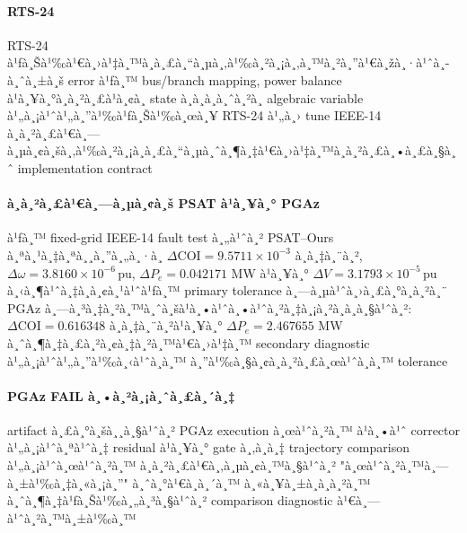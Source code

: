 ﻿\documentclass[12pt,a4paper]{article}
\newcommand{\pu}{\ensuremath{\,\mathrm{pu}}}
\newcommand{\sci}[2]{\ensuremath{#1\times10^{#2}}}
\begin{document}
\paragraph{RTS-24}
RTS-24 à¹ƒà¸Šà¹‰à¹€à¸›à¹‡à¸™à¸à¸£à¸“à¸µà¸‚à¹‰à¸²à¸¡à¸‚à¸™à¸²à¸”à¹€à¸žà¸·à¹ˆà¸­à¸ˆà¸±à¸š error à¹ƒà¸™ bus/branch mapping, power balance
à¹à¸¥à¸°à¸à¸²à¸£à¹à¸¢à¸ state à¸­à¸­à¸à¸ˆà¸²à¸ algebraic variable à¹„à¸¡à¹ˆà¹„à¸”à¹‰à¹ƒà¸Šà¹‰à¸œà¸¥ RTS-24 à¹„à¸› tune
IEEE-14 à¸à¸²à¸£à¹€à¸—à¸µà¸¢à¸šà¸‚à¹‰à¸²à¸¡à¸à¸£à¸“à¸µà¸ˆà¸¶à¸‡à¹€à¸›à¹‡à¸™à¸à¸²à¸£à¸•à¸£à¸§à¸ˆ implementation contract

\paragraph{à¸à¸²à¸£à¹€à¸—à¸µà¸¢à¸š PSAT à¹à¸¥à¸° PGAz}
à¹ƒà¸™ fixed-grid IEEE-14 fault test à¸„à¹ˆà¸² PSAT--Ours à¸ªà¸¹à¸‡à¸ªà¸¸à¸”à¸„à¸·à¸­
$\Delta\mathrm{COI}=\sci{9.5711}{-3}$ à¸­à¸‡à¸¨à¸²,
$\Delta\omega=\sci{3.8160}{-6}\pu$,
$\Delta P_e=0.042171$ MW à¹à¸¥à¸°
$\Delta V=\sci{3.1793}{-5}\pu$ à¸‹à¸¶à¹ˆà¸‡à¸­à¸¢à¸¹à¹ˆà¹ƒà¸™ primary tolerance à¸—à¸µà¹ˆà¸›à¸£à¸°à¸à¸²à¸¨
PGAz à¸—à¸³à¸‡à¸²à¸™à¸ˆà¸šà¹à¸•à¹ˆà¸•à¹ˆà¸²à¸‡à¸¡à¸²à¸à¸à¸§à¹ˆà¸²: $\Delta\mathrm{COI}=0.616348$ à¸­à¸‡à¸¨à¸²à¹à¸¥à¸°
$\Delta P_e=2.467655$ MW à¸ˆà¸¶à¸‡à¸£à¸²à¸¢à¸‡à¸²à¸™à¹€à¸›à¹‡à¸™ secondary diagnostic à¹„à¸¡à¹ˆà¹„à¸”à¹‰à¸‹à¹ˆà¸­à¸™
à¸”à¹‰à¸§à¸¢à¸à¸²à¸£à¸œà¹ˆà¸­à¸™ tolerance

\paragraph{PGAz FAIL à¸•à¸²à¸¡à¸ˆà¸£à¸´à¸‡}
artifact à¸£à¸°à¸šà¸¸à¸§à¹ˆà¸² PGAz execution à¸œà¹ˆà¸²à¸™ à¹à¸•à¹ˆ corrector à¹„à¸¡à¹ˆà¸ªà¹ˆà¸‡ residual à¹à¸¥à¸° gate
à¸‚à¸­à¸‡ trajectory comparison à¹„à¸¡à¹ˆà¸œà¹ˆà¸²à¸™ à¸à¸²à¸£à¹€à¸‚à¸µà¸¢à¸™à¸§à¹ˆà¸² "à¸œà¹ˆà¸²à¸™à¸—à¸±à¹‰à¸‡à¸«à¸¡à¸”" à¸ˆà¸°à¹€à¸à¸´à¸™
à¸«à¸¥à¸±à¸à¸à¸²à¸™ à¸ˆà¸¶à¸‡à¹ƒà¸Šà¹‰à¸„à¸³à¸§à¹ˆà¸² comparison diagnostic à¹€à¸—à¹ˆà¸²à¸™à¸±à¹‰à¸™

\par\vspace{5pt}
\end{document}
